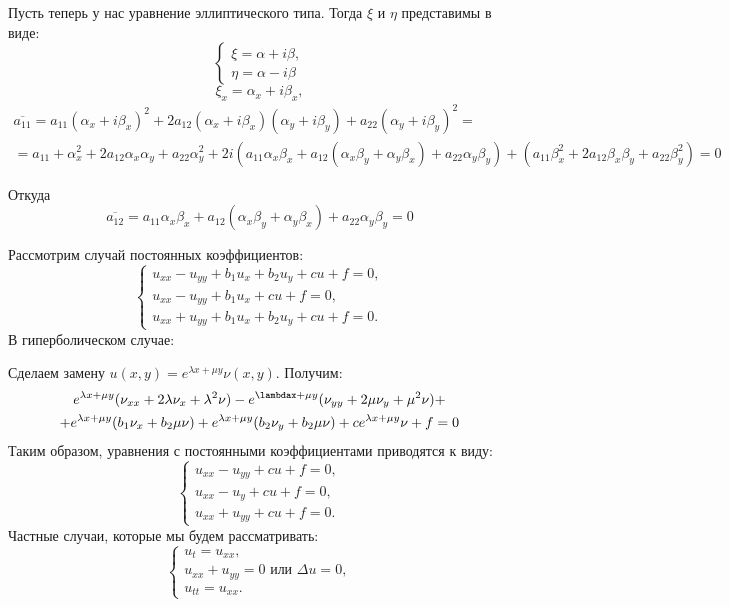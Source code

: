 \documentclass[11pt]{article}
\begin{document}
Пусть теперь у нас уравнение эллиптического типа. Тогда \(\xi\) и \(\eta\) представимы в виде:
\begin{equation*}
\begin{cases}
\xi = \alpha + i\beta, \\
\eta = \alpha - i\beta
\end{cases}
\end{equation*}
\begin{equation*}
\xi_x = \alpha_x + i\beta_x,
\end{equation*}
\begin{multline*}
\overline{a_{11}} = a_{11}(\alpha_x + i\beta_x)^2 +
2a_{12}(\alpha_x + i\beta_x)(\alpha_y + i\beta_y) + a_{22}(\alpha_y + i\beta_y)^2 = \\
= a_{11} + \alpha_x^2 + 2a_{12}\alpha_x\alpha_y + a_{22}\alpha_y^2 + 2i(a_{11}\alpha_x\beta_x +
a_{12}(\alpha_x\beta_y + \alpha_y\beta_x) + a_{22}\alpha_y\beta_y) + (a_{11}\beta_x^2 +
2a_{12}\beta_x\beta_y + a_{22}\beta_y^2) = 0
\end{multline*}

Откуда
\begin{equation*}
\overline{a_{12}} = a_{11}\alpha_x\beta_x + a_{12}(\alpha_x\beta_y + \alpha_y\beta_x) + a_{22}\alpha_y\beta_y = 0
\end{equation*}

Рассмотрим случай постоянных коэффициентов:
\begin{equation}
\begin{cases}
u_{xx} - u_{yy} + b_1u_x + b_2u_y + cu + f = 0, \\
u_{xx} - u_{yy} + b_1u_x + cu + f = 0, \\
u_{xx} + u_{yy} + b_1u_x + b_2u_y + cu + f = 0.
\end{cases}
\end{equation}
В гиперболическом случае:

Сделаем замену \(u(x, y) = e^{\lambda x + \mu y}\nu(x, y)\). Получим:
\begin{multline*}
e^{\lambda x + \mu y}(\nu_{xx} + 2\lambda\nu_x + \lambda^2\nu) - e^{\lambdax + \mu y}(\nu_{yy} + 2\mu\nu_y + \mu^2\nu) + \\
+ e^{\lambda x + \mu y}(b_1\nu_x + b_2\mu\nu) + e^{\lambda x + \mu y}(b_2\nu_y + b_2\mu\nu) + ce^{\lambda x + \mu y}\nu + f = 0
\end{multline*}
Таким образом, уравнения с постоянными коэффициентами приводятся к виду:
\begin{equation}
\begin{cases}
u_{xx} - u_{yy} + cu + f = 0, \\
u_{xx} - u_y + cu + f = 0, \\
u_{xx} + u_{yy} + cu + f = 0.
\end{cases}
\end{equation}
Частные случаи, которые мы будем рассматривать:
\begin{equation}
\begin{cases}
u_t = u_{xx}, \\
u_{xx} + u_{yy} = 0 \text{ или } \Delta u = 0, \\
u_{tt} = u_{xx}.
\end{cases}
\end{equation}
\end{document}
